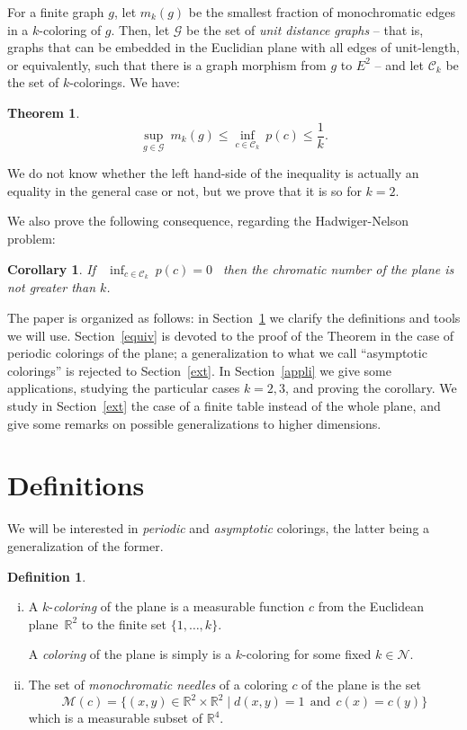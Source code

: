 \documentclass[a4paper,11pt]{article}
\newtheorem{cons}{Corollary}
\newtheorem*{theo*}{Theorem}
\theoremstyle{definition}
\newtheorem{definition}{Definition}
\theoremstyle{remark}
\newcommand{\R}{\mathbb{R}}
\newcommand{\M}{\mathcal{M}}
\newcommand{\N}{\mathcal{N}}
\newcommand{\C}{\mathcal{C}}
\newcommand{\Ca}{\mathcal{C}}
\begin{document}
For a finite graph $g$, let $m_k(g)$ be the smallest fraction of monochromatic
edges in a $k$-coloring of $g$. Then, let $\mathcal{G}$ be the set of 
\textit{unit distance graphs} -- that is, graphs that can be embedded in the
Euclidian plane with all edges of unit-length, or equivalently, such that there is
a graph morphism from $g$ to $E^2$ -- and let $\C_k$ be the set of $k$-colorings. We
have:
\begin{theo*}
$$ \sup_{g \in \mathcal{G}} \ m_k(g) \leq \inf_{c \in \C_k} \ p(c) \leq \frac{1}{k}. $$
\end{theo*}
We do not know whether the left hand-side of the inequality is actually an equality in
the general case or not, but we prove that it is so for $k=2$.

We also prove the following consequence, regarding the Hadwiger-Nelson problem:
\begin{cons} \label{con}
If \ $\inf_{c \in \Ca_k} \ p(c) = 0$ \ then the chromatic number of the
plane is not greater than $k$.
\end{cons}

The paper is organized as follows: in Section~\ref{defsection} we clarify the
definitions and tools we will use. Section~\ref{equiv} is devoted to the proof 
of the Theorem in the case of periodic colorings of the plane; a generalization
to what we call ``asymptotic colorings'' is rejected to Section~\ref{ext}.
In Section~\ref{appli} we give some applications, studying the particular cases $k=2,3$,
and proving the corollary.
We study in Section~\ref{ext} the case of a finite table instead of the whole plane, 
and give some remarks on possible 
generalizations to higher dimensions.

\section{Definitions} \label{defsection}
We will be interested in \textit{periodic} and \textit{asymptotic} colorings,
the latter being a generalization of the former.
\begin{definition}
\
\begin{enumerate}[i)] 
\item A $k$-\textit{coloring} of the plane is a measurable function $c$ from the Euclidean 
plane~$\R ^2$ to the finite set $\{1, \dots , k \}$.

A \textit{coloring} of the plane is simply is a $k$-coloring for some fixed $k \in \N$.
\item The set of \textit{monochromatic needles} of a coloring $c$ of the plane is the set
\[ \M (c) = \{(x,y) \in \R ^2 \times \R ^2 \mid d(x,y) = 1 \ \ \mathrm{and} \ \ c(x) = c(y) \} \]
which is a measurable subset of $\R ^4$.
\end{enumerate}
\end{definition}
\end{document}

